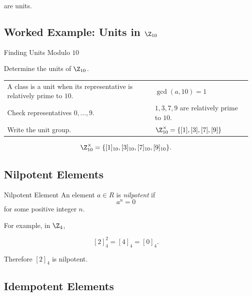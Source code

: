 are units.

\subsection{Worked Example: Units in \(\Z_{10}\)}
\label{subsec:worked-units-z10}

\begin{workedexamplebox}{Finding Units Modulo \(10\)}

Determine the units of \(\Z_{10}\).

\begin{tabularx}{\textwidth}{@{}>{\raggedright\arraybackslash}p{}X@{}}
A class is a unit when its representative is relatively prime to \(10\). & \(\gcd(a,10)=1\)\\
Check representatives \(0,\ldots,9\). & \(1,3,7,9\) are relatively prime to \(10\).\\
Write the unit group. & \(\Z_{10}^{\times}=\{[1],[3],[7],[9]\}\)
\end{tabularx}

\begin{answerbox}
\[ \Z_{10}^{\times}=\{[1]_{10},[3]_{10},[7]_{10},[9]_{10}\}. \]
\end{answerbox}
\end{workedexamplebox}

\subsection{Nilpotent Elements}
\label{subsec:nilpotent-elements}

\begin{definitionbox}{Nilpotent Element}
An element \(a\in R\) is \emph{nilpotent} if
\[ a^n=0 \]
for some positive integer \(n\).
\end{definitionbox}

For example, in \(\Z_4\),

\[ [2]_4^2=[4]_4=[0]_4. \]

Therefore \([2]_4\) is nilpotent.

\subsection{Idempotent Elements}
\label{subsec:idempotent-elements}

